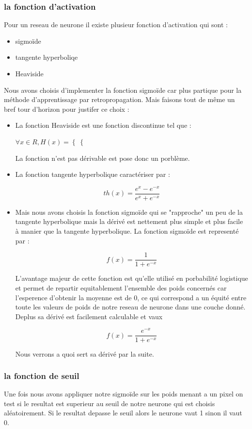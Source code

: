 \subsubsection{la fonction d'activation}
Pour un reseau de neurone il existe plusieur fonction d'activation qui sont :
\begin{itemize}
\item sigmoïde
\item tangente hyperboliqe
\item Heaviside
\end{itemize}
\vspace{0.5cm}
Nous avons choisis d'implementer la fonction sigmoïde car plus partique pour la méthode d'apprentissage par retropropagation.
Mais faisons tout de même un bref tour d'horizon pour justifer ce choix :
\begin{itemize}
\item
La fonction Heaviside est une fonction discontinue tel que :
\begin{center}
$
 \forall x \in R, H(x) =  \left \{
\right \{
 $
\end{center}
La fonction n'est pas dérivable est pose donc un porblème.
\item
La fonction tangente hyperbolique caractériser par :
\begin{center}
\[ th(x) = \frac{e^{x} - e^{-x}}{e^{x} + e^{-x}}\]
\end{center}
\item
Mais nous avons choisis la fonction sigmoïde qui se "rapproche" un peu de la tangente hyperbolique mais la dérivé est nettement plus simple et plus facile à manier que la tangente hyperbolique. La fonction sigmoïde est representé par :
\begin{center}
\[ f(x) = \frac{1}{1 + e^{-x}} \]
\end{center}
L'avantage majeur de cette fonction est qu'elle utilisé en porbabilité logistique et permet de repartir equitablement l'ensemble des poids concernés car l'esperence d'obtenir la moyenne est de 0, ce qui correspond a un équité entre toute les valeurs de poids de notre reseau de neurone dans une couche donné.
Deplus sa dérivé est facilement calculable et vaux
\begin{center}
\[ f(x) = \frac{e^{-x}}{1+e^{-x}} \]
\end{center}
Nous verrons a quoi sert sa dérivé par la suite.
\end{itemize}

\subsubsection{la fonction de seuil}
Une fois nous avons appliquer notre sigmoïde sur les poids menant a un pixel on test si le resultat est superieur au seuil de notre neurone qui est choisis aléatoirement.
Si le resultat depasse le seuil alors le neurone vaut 1 sinon il vaut 0.

